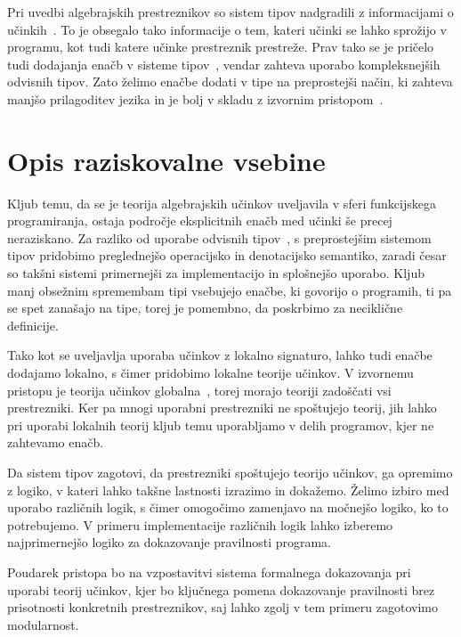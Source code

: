 \documentclass{article}
\begin{document}
Pri uvedbi algebrajskih prestreznikov so sistem tipov nadgradili z informacijami o učinkih~\cite{DBLP:journals/corr/BauerP13,DBLP:conf/icfp/KammarLO13}. To je obsegalo tako informacije o tem, kateri učinki se lahko sprožijo v programu, kot tudi katere učinke prestreznik prestreže. Prav tako se je pričelo tudi dodajanja enačb v sisteme tipov~\cite{DBLP:journals/pacmpl/Ahman18}, vendar zahteva uporabo kompleksnejših odvisnih tipov. Zato želimo enačbe dodati v tipe na preprostejši način, ki zahteva manjšo prilagoditev jezika in je bolj v skladu z izvornim pristopom~\cite{DBLP:phd/ethos/Pretnar10}.

\section*{Opis raziskovalne vsebine}

Kljub temu, da se je teorija algebrajskih učinkov uveljavila v sferi funkcijskega programiranja, ostaja področje eksplicitnih enačb med učinki še precej neraziskano. Za razliko od uporabe odvisnih tipov~\cite{DBLP:journals/pacmpl/Ahman18}, s preprostejšim sistemom tipov pridobimo preglednejšo operacijsko in denotacijsko semantiko, zaradi česar so takšni sistemi primernejši za implementacijo in splošnejšo uporabo. Kljub manj obsežnim spremembam tipi vsebujejo enačbe, ki govorijo o programih, ti pa se spet zanašajo na tipe, torej je pomembno, da poskrbimo za neciklične definicije. 

Tako kot se uveljavlja uporaba učinkov z lokalno signaturo, lahko tudi enačbe dodajamo lokalno, s čimer pridobimo lokalne teorije učinkov. V izvornemu pristopu je teorija učinkov globalna~\cite{DBLP:conf/esop/PlotkinP09}, torej morajo teoriji zadoščati vsi prestrezniki. Ker pa mnogi uporabni prestrezniki ne spoštujejo teorij, jih lahko pri uporabi lokalnih teorij kljub temu uporabljamo v delih programov, kjer ne zahtevamo enačb.

Da sistem tipov zagotovi, da prestrezniki spoštujejo teorijo učinkov, ga opremimo z logiko, v kateri lahko takšne lastnosti izrazimo in dokažemo. Želimo izbiro med uporabo različnih logik, s čimer omogočimo zamenjavo na močnejšo logiko, ko to potrebujemo. V primeru implementacije različnih logik lahko izberemo najprimernejšo logiko za dokazovanje pravilnosti programa.

Poudarek pristopa bo na vzpostavitvi sistema formalnega dokazovanja pri uporabi teorij učinkov, kjer bo ključnega pomena dokazovanje pravilnosti brez prisotnosti konkretnih prestreznikov, saj lahko zgolj v tem primeru zagotovimo modularnost. 
\end{document}
